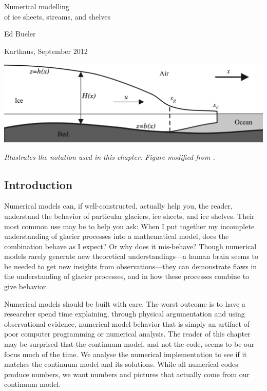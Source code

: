 \documentclass[titlepage,letterpaper,final,12pt]{scrartcl}
\begin{document}
\graphicspath{{../photos/}{../pdffigs/}}


\begin{titlepage}

  \begin{center}
    {\Large{} Numerical modelling \\ of ice sheets, streams, and shelves}
    \vspace{0.5cm}

    {\large Ed Bueler}
    \vspace{1cm}

    Karthaus, September 2012

    \vfill
    
    \includegraphics[width=6.0in]{flowline}
  
    \scriptsize \emph{Illustrates the notation used in this chapter.  Figure modified from \cite{SchoofMarine1}.} \normalsize
    
    \vspace{2.0in}
  \end{center}
\end{titlepage}

\clearpage\newpage

\setcounter{section}{1}
\subsection{Introduction}

Numerical models can, if well-constructed, actually help you, the reader, understand the behavior of particular glaciers, ice sheets, and ice shelves.  Their most common use may be to help you ask: When I put together my incomplete understanding of glacier processes into a mathematical model, does the combination behave as I expect?  Or why does it mis-behave?  Though numerical models rarely generate new theoretical understandings---a human brain seems to be needed to get new insights from observations---they can demonstrate flaws in the understanding of glacier processes, and in how these processes combine to give behavior.

Numerical models should be built with care.  The worst outcome is to have a researcher spend time explaining, through physical argumentation and using observational evidence, numerical model behavior that is simply an artifact of poor computer programming or numerical analysis.  The reader of this chapter may be surprised that the continuum model, and not the code, seems to be our focus much of the time.  We analyse the numerical implementation to see if it matches the continuum model and its solutions.  While all numerical codes produce numbers, we want numbers and pictures that actually come from our continuum model.
\end{document}
